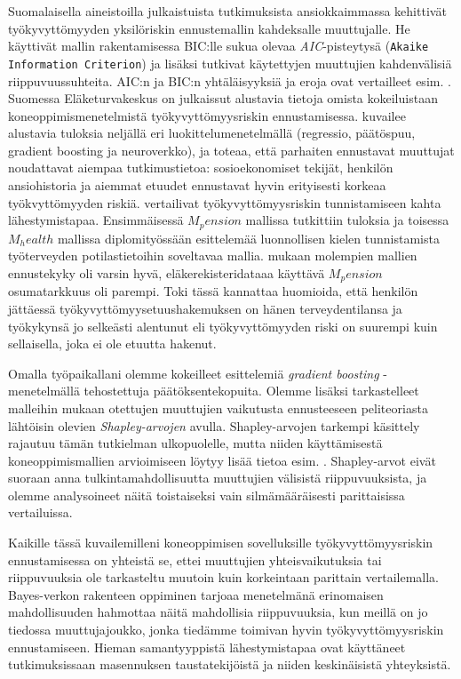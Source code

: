 Suomalaisella aineistoilla julkaistuista tutkimuksista ansiokkaimmassa \citet{airaksinen_development_2017} kehittivät työkyvyttömyyden yksilöriskin ennustemallin kahdeksalle muuttujalle. He käyttivät mallin rakentamisessa BIC:lle sukua olevaa \emph{AIC}-pisteytysä (\texttt{Akaike Information Criterion}) ja lisäksi tutkivat käytettyjen muuttujien kahdenvälisiä riippuvuussuhteita. AIC:n ja BIC:n yhtäläisyyksiä ja eroja ovat vertailleet esim. \citet{ding_model_2018}. Suomessa Eläketurvakeskus on julkaissut alustavia tietoja omista kokeiluistaan koneoppimismenetelmistä työkyvyttömyysriskin ennustamisessa. \citet{varis_aketurvakeskuksen_2018} kuvailee alustavia tuloksia neljällä eri luokittelumenetelmällä (regressio, päätöspuu, gradient boosting ja neuroverkko), ja toteaa, että parhaiten ennustavat muuttujat noudattavat aiempaa tutkimustietoa: sosioekonomiset tekijät, henkilön ansiohistoria ja aiemmat etuudet ennustavat hyvin erityisesti korkeaa työkvyttömyyden riskiä.  \citet{saarela_work_2022} vertailivat työkyvyttömyysriskin tunnistamiseen kahta lähestymistapaa. Ensimmäisessä $M_pension$ mallissa tutkittiin \citet{varis_aketurvakeskuksen_2018} tuloksia ja toisessa $M_health$ mallissa \cite{huhta-koivisto_work_2020} diplomityössään esittelemää luonnollisen kielen tunnistamista työterveyden potilastietoihin soveltavaa mallia. \citet{varis_aketurvakeskuksen_2018} mukaan molempien mallien ennustekyky oli varsin hyvä, eläkerekisteridataaa käyttävä $M_pension$ osumatarkkuus oli parempi. Toki tässä kannattaa huomioida, että henkilön jättäessä työkyvyttömyysetuushakemuksen on hänen terveydentilansa ja työkykynsä jo selkeästi alentunut eli työkyvyttömyyden riski on suurempi kuin sellaisella, joka ei ole etuutta hakenut.

Omalla työpaikallani olemme kokeilleet \citet{friedman_greedy_2001} esittelemiä \emph{gradient boosting} -menetelmällä tehostettuja päätöksentekopuita. Olemme lisäksi tarkastelleet malleihin mukaan otettujen muuttujien vaikutusta ennusteeseen peliteoriasta lähtöisin olevien \emph{Shapley-arvojen} avulla. Shapley-arvojen tarkempi käsittely rajautuu tämän tutkielman ulkopuolelle, mutta niiden käyttämisestä koneoppimismallien arvioimiseen löytyy lisää tietoa esim. \citet{merrick_explanation_2020}. Shapley-arvot eivät suoraan anna tulkintamahdollisuutta muuttujien välisistä riippuvuuksista, ja olemme analysoineet näitä toistaiseksi vain silmämääräisesti parittaisissa vertailuissa.

Kaikille tässä kuvailemilleni koneoppimisen sovelluksille työkyvyttömyysriskin ennustamisessa on yhteistä se, ettei muuttujien yhteisvaikutuksia tai riippuvuuksia ole tarkasteltu muutoin kuin korkeintaan parittain vertailemalla. Bayes-verkon rakenteen oppiminen tarjoaa menetelmänä erinomaisen mahdollisuuden hahmottaa näitä mahdollisia riippuvuuksia, kun meillä on jo tiedossa muuttujajoukko, jonka tiedämme toimivan hyvin työkyvyttömyysriskin ennustamiseen. Hieman samantyyppistä lähestymistapaa ovat käyttäneet \citet{elovainio_is_2021, elovainio_network_2020} tutkimuksissaan masennuksen taustatekijöistä ja niiden keskinäisistä yhteyksistä.


